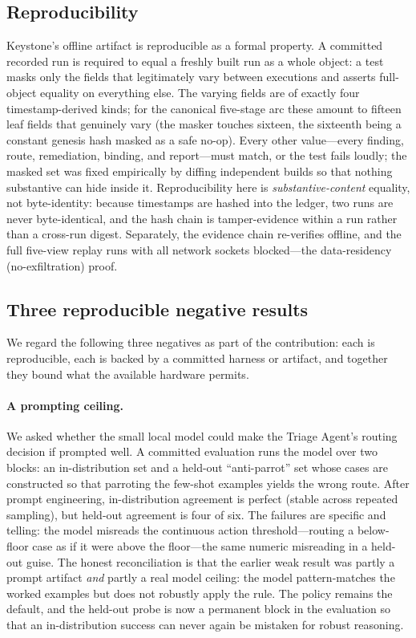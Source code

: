 \documentclass[10pt,twocolumn]{article}
\begin{document}
\subsection{Reproducibility}

Keystone's offline artifact is reproducible as a formal property. A committed
recorded run is required to equal a freshly built run as a whole object: a test
masks only the fields that legitimately vary between executions and asserts
full-object equality on everything else. The varying fields are of exactly four
timestamp-derived kinds; for the canonical five-stage arc these amount to fifteen
leaf fields that genuinely vary (the masker touches sixteen, the sixteenth being
a constant genesis hash masked as a safe no-op). Every other value---every
finding, route, remediation, binding, and report---must match, or the test fails
loudly; the masked set was fixed empirically by diffing independent builds so
that nothing substantive can hide inside it. Reproducibility here is
\emph{substantive-content} equality, not byte-identity: because timestamps are
hashed into the ledger, two runs are never byte-identical, and the hash chain is
tamper-evidence within a run rather than a cross-run digest. Separately, the
evidence chain re-verifies offline, and the full five-view replay runs with all
network sockets blocked---the data-residency (no-exfiltration) proof.

\subsection{Three reproducible negative results}

We regard the following three negatives as part of the contribution: each is
reproducible, each is backed by a committed harness or artifact, and together
they bound what the available hardware permits.

\paragraph{A prompting ceiling.}
We asked whether the small local model could make the Triage Agent's routing
decision if prompted well. A committed evaluation runs the model over two blocks:
an in-distribution set and a held-out ``anti-parrot'' set whose cases are
constructed so that parroting the few-shot examples yields the wrong route. After
prompt engineering, in-distribution agreement is perfect (stable across repeated
sampling), but held-out agreement is four of six. The failures are specific and
telling: the model misreads the continuous action threshold---routing a
below-floor case as if it were above the floor---the same numeric misreading in a
held-out guise. The honest reconciliation is that the earlier weak result was
partly a prompt artifact \emph{and} partly a real model ceiling: the model
pattern-matches the worked examples but does not robustly apply the rule. The
policy remains the default, and the held-out probe is now a permanent block in
the evaluation so that an in-distribution success can never again be mistaken for
robust reasoning.
\end{document}
